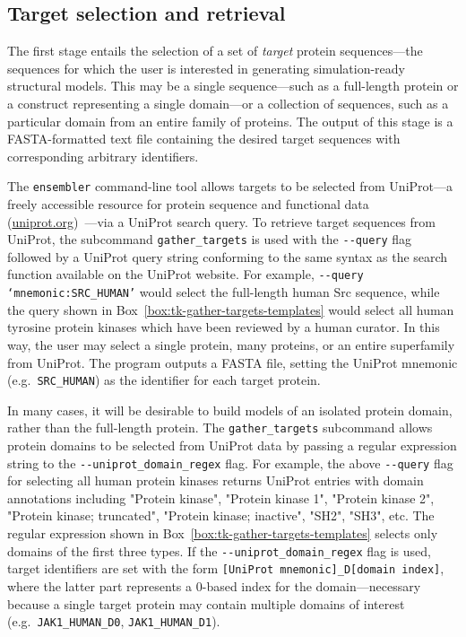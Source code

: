 \documentclass[aps,pre,twocolumn,nofootinbib,superscriptaddress,linenumbers]{revtex4-1}
\begin{document}
\subsection{Target selection and retrieval}

The first stage entails the selection of a set of \emph{target} protein sequences---the sequences for which the user is interested in generating simulation-ready structural models.
This may be a single sequence---such as a full-length protein or a construct representing a single domain---or a collection of sequences, such as a particular domain from an entire family of proteins.
The output of this stage is a FASTA-formatted text file containing the desired target sequences with corresponding arbitrary identifiers.

The {\tt ensembler} command-line tool allows targets to be selected from UniProt---a freely accessible resource for protein sequence and functional data (\href{http://www.uniprot.org/}{uniprot.org})~\cite{uniprot:2015}---via a UniProt search query.
To retrieve target sequences from UniProt, the subcommand {\tt gather\_targets} is used with the {\tt -{}-query} flag followed by a UniProt query string conforming to the same syntax as the search function available on the UniProt website.
For example, {\tt -{}-query `mnemonic:SRC\_HUMAN'} would select the full-length human Src sequence, while the query shown in Box~\ref{box:tk-gather-targets-templates} would select all human tyrosine protein kinases which have been reviewed by a human curator.
In this way, the user may select a single protein, many proteins, or an entire superfamily from UniProt.
The program outputs a FASTA file, setting the UniProt mnemonic (e.g.~{\tt SRC\_HUMAN}) as the identifier for each target protein.

In many cases, it will be desirable to build models of an isolated protein domain, rather than the full-length protein.
The {\tt gather\_targets} subcommand allows protein domains to be selected from UniProt data by passing a regular expression string to the {\tt -{}-uniprot\_domain\_regex} flag. 
For example, the above {\tt -{}-query} flag for selecting all human protein kinases returns UniProt entries with domain annotations including "Protein kinase", "Protein kinase 1", "Protein kinase 2", "Protein kinase; truncated", "Protein kinase; inactive", "SH2", "SH3", etc.
The regular expression shown in Box~\ref{box:tk-gather-targets-templates} selects only domains of the first three types.
If the {\tt -{}-uniprot\_domain\_regex} flag is used, target identifiers are set with the form {\tt [UniProt mnemonic]\_D[domain index]}, where the latter part represents a 0-based index for the domain---necessary because a single target protein may contain multiple domains of interest (e.g.~{\tt JAK1\_HUMAN\_D0}, {\tt JAK1\_HUMAN\_D1}).
\end{document}
